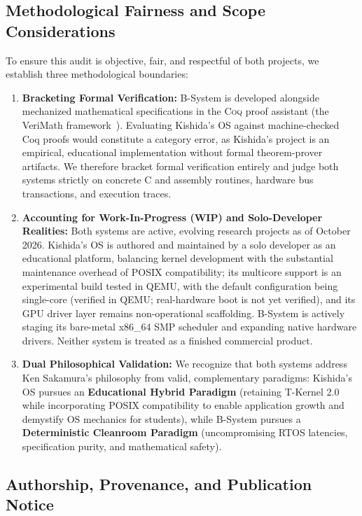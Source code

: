 \documentclass[10pt,journal,compsoc,twocolumn]{article}
\begin{document}
\subsection{Methodological Fairness and Scope Considerations}
To ensure this audit is objective, fair, and respectful of both projects, we establish three methodological boundaries:
\begin{enumerate}[leftmargin=*]
    \item \textbf{Bracketing Formal Verification:} B-System is developed alongside mechanized mathematical specifications in the \textsc{Coq} proof assistant (the VeriMath framework~\cite{sokhatsky2026verimath}). Evaluating Kishida's OS against machine-checked Coq proofs would constitute a category error, as Kishida's project is an empirical, educational implementation without formal theorem-prover artifacts. We therefore bracket formal verification entirely and judge both systems strictly on concrete C and assembly routines, hardware bus transactions, and execution traces.
    \item \textbf{Accounting for Work-In-Progress (WIP) and Solo-Developer Realities:} Both systems are active, evolving research projects as of October 2026. Kishida's OS is authored and maintained by a solo developer as an educational platform, balancing kernel development with the substantial maintenance overhead of POSIX compatibility; its multicore support is an experimental build tested in QEMU, with the default configuration being single-core (verified in QEMU; real-hardware boot is not yet verified), and its GPU driver layer remains non-operational scaffolding. B-System is actively staging its bare-metal x86\_64 SMP scheduler and expanding native hardware drivers. Neither system is treated as a finished commercial product.
    \item \textbf{Dual Philosophical Validation:} We recognize that both systems address Ken Sakamura's philosophy from valid, complementary paradigms: Kishida's OS pursues an \textbf{Educational Hybrid Paradigm} (retaining T-Kernel 2.0 while incorporating POSIX compatibility to enable application growth and demystify OS mechanics for students), while B-System pursues a \textbf{Deterministic Cleanroom Paradigm} (uncompromising RTOS latencies, specification purity, and mathematical safety).
\end{enumerate}

\subsection{Authorship, Provenance, and Publication Notice}
\label{sec:provenance}
\end{document}
